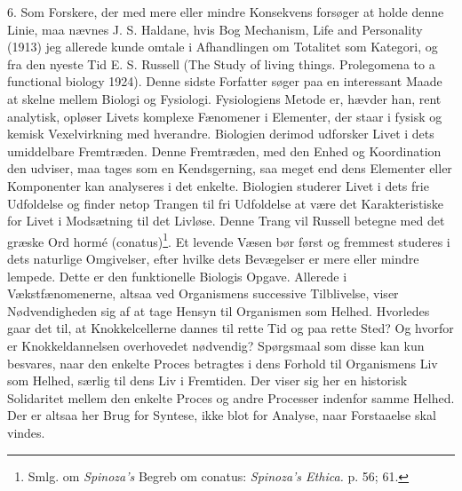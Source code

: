 \documentclass[12pt]{article}
\newcommand{\opage}[1]{\marginnote{\footnotesize\textit{[#1]}}}
\begin{document}
6. Som Forskere, der med mere eller mindre Konsekvens forsøger at
holde denne Linie, maa nævnes
\setcounter{footnote}{0}%
\opage{24}J. S. Haldane, hvis Bog \guillemotright{}Mechanism, Life and Personality\guillemotleft{}
(1913) jeg allerede kunde omtale i Afhandlingen om Totalitet som
Kategori, og fra den nyeste Tid E. S. Russell (The Study of living
things. Prolegomena to a functional biology 1924). Denne sidste
Forfatter søger paa en interessant Maade at skelne mellem Biologi og
Fysiologi. Fysiologiens Metode er, hævder han, rent analytisk, opløser
Livets komplexe Fænomener i Elementer, der staar i fysisk og kemisk
Vexelvirkning med hverandre. Biologien derimod udforsker Livet i dets
umiddelbare Fremtræden. Denne Fremtræden, med den Enhed og
Koordination den udviser, maa tages som en Kendsgerning, saa meget end
dens Elementer eller Komponenter kan analyseres i det enkelte.
Biologien studerer Livet i dets frie Udfoldelse og finder netop
Trangen til fri Udfoldelse at være det Karakteristiske for Livet i
Modsætning til det Livløse. Denne Trang vil Russell betegne med det
græske Ord hormé (conatus)\footnote{Smlg. om \textit{Spinoza's} Begreb
om conatus: \textit{Spinoza's Ethica.} p. 56; 61.}. Et levende Væsen
bør først og fremmest studeres i dets naturlige Omgivelser, efter
hvilke dets Bevægelser er mere eller mindre lempede. Dette er den
funktionelle Biologis Opgave. Allerede i Vækstfænomenerne, altsaa ved
Organismens successive Tilblivelse, viser Nødvendigheden sig af at
tage Hensyn til Organismen som Helhed. Hvorledes gaar det til, at
Knokkelcellerne dannes til rette Tid og paa rette Sted? Og hvorfor er
Knokkeldannelsen overhovedet nødvendig? Spørgsmaal som disse kan kun
besvares, naar den enkelte Proces betragtes i dens Forhold til
Organismens Liv som Helhed, særlig til dens Liv i Fremtiden. Der viser
sig her en historisk Solidaritet mellem den enkelte Proces og andre
Processer indenfor
\opage{25}samme Helhed. Der er altsaa her Brug for Syntese, ikke blot for
Analyse, naar Forstaaelse skal vindes.
\end{document}
